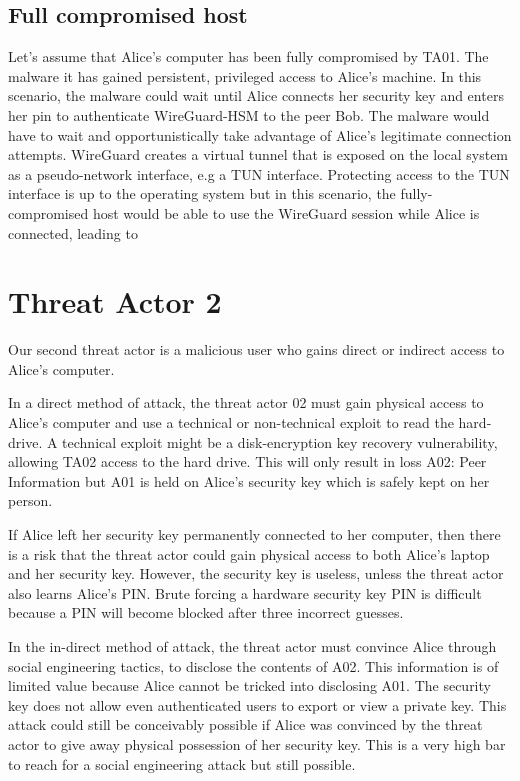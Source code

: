 \documentclass [11pt, proquest] {uwthesis}[2020/02/24]
\begin{document}
\subsection{Full compromised host}
Let's assume that Alice's computer has been fully compromised by TA01. The malware it has gained persistent, privileged access to Alice's machine. In this scenario, the malware could wait until Alice connects her security key and enters her pin to authenticate WireGuard-HSM to the peer Bob. The malware would have to wait and opportunistically take advantage of Alice's legitimate connection attempts.
WireGuard creates a virtual tunnel that is exposed on the local system as a pseudo-network interface, e.g a TUN interface. Protecting access to the TUN interface is up to the operating system but in this scenario, the fully-compromised host would be able to use the WireGuard session while Alice is connected, leading to 


\section{Threat Actor 2}
Our second threat actor is a malicious user who gains direct or indirect access to Alice's computer. 

In a direct method of attack, the threat actor 02 must gain physical access to Alice's computer and use a technical or non-technical exploit to read the hard-drive. A technical exploit might be a disk-encryption key recovery vulnerability, allowing TA02 access to the hard drive. This will only result in loss A02: Peer Information but A01 is held on Alice's security key which is safely kept on her person.

If Alice left her security key permanently connected to her computer, then there is a risk that the threat actor could gain physical access to both Alice's laptop and her security key. However, the security key is useless, unless the threat actor also learns Alice's PIN. Brute forcing a hardware security key PIN is difficult because a PIN will become blocked after three incorrect guesses.

In the in-direct method of attack, the threat actor must convince Alice through social engineering tactics, to disclose the contents of A02. This information is of limited value because Alice cannot be tricked into disclosing A01. The security key does not allow even authenticated users to export or view a private key.
This attack could still be conceivably possible if Alice was convinced by the threat actor to give away physical possession of her security key. This is a very high bar to reach for a social engineering attack but still possible.
\end{document}

